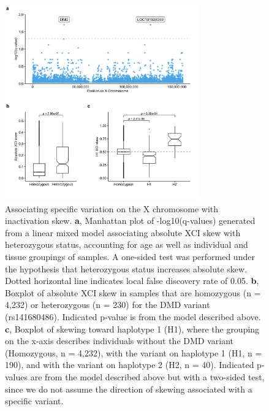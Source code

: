 \begin{figure}[ht!]
    \centering
    \includegraphics[width=0.75\textwidth]{chapter4/Figures/Figure_3.png}
    \caption{
        Associating specific variation on the X chromosome with inactivation skew. 
        \textbf{a}, Manhattan plot of -log10(q-values) generated from a linear mixed model associating absolute XCI skew with heterozygous status, accounting for age as well as individual and tissue groupings of samples. A one-sided test was performed under the hypothesis that heterozygous status increases absolute skew. Dotted horizontal line indicates local false discovery rate of 0.05. 
        \textbf{b}, Boxplot of absolute XCI skew in samples that are homozygous  (n = 4,232) or heterozygous (n = 230) for the DMD variant (rs141680486). Indicated p-value is from the model described above.
        \textbf{c}, Boxplot of skewing toward haplotype 1 (H1), where the grouping on the x-axis describes individuals without the DMD variant (Homozygous, n = 4,232), with the variant on haplotype 1 (H1, n = 190), and with the variant on haplotype 2 (H2, n = 40). Indicated p-values are from the model described above but with a two-sided test, since we do not assume the direction of skewing associated with a specific variant.}
    \label{fig:fig4.3}
\end{figure}